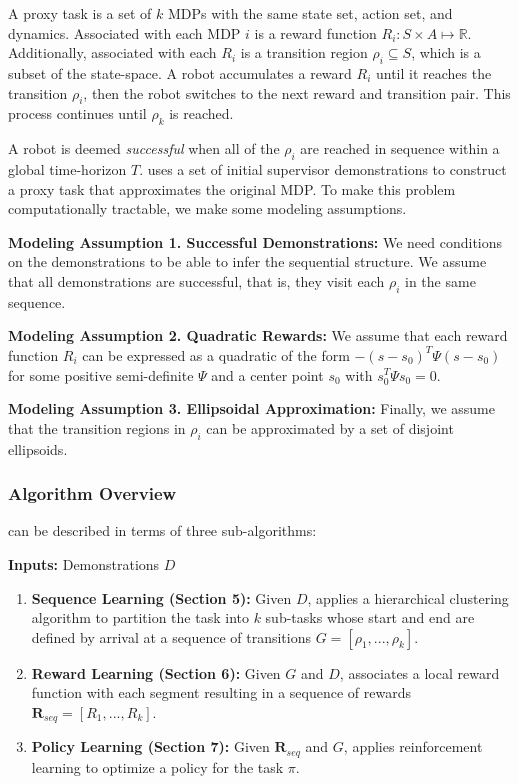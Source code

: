 \begin{definition}
A proxy task is a set of $k$ MDPs with the same state set, action set, and dynamics. 
Associated with each MDP $i$ is a reward function  $R_i: S \times A \mapsto \mathbb{R}$. Additionally, associated with each $R_i$ is a transition region $\rho_i \subseteq S$, which is a subset of the state-space. A robot accumulates a reward $R_i$ until it reaches the transition $\rho_i$, then the robot switches to the next reward and transition pair.
This process continues until $\rho_k$ is reached.
\end{definition}

A robot is deemed \emph{successful} when all of the $\rho_i$ are reached in sequence within a global time-horizon $T$. \hirl uses a set of initial supervisor demonstrations to construct a proxy task that approximates the original MDP. To make this problem computationally tractable, we make some modeling assumptions.

\vspace{0.5em}\noindent\textbf{Modeling Assumption 1. Successful Demonstrations: } We need conditions on the demonstrations to be able to infer the sequential structure. We assume that all demonstrations are successful, that is, they visit each $\rho_i$ in the same sequence.

\vspace{0.5em}\noindent\textbf{Modeling Assumption 2. Quadratic Rewards: } We assume that each reward function $R_i$ can be expressed as a quadratic of the form $-(s-s_0)^T \Psi (s - s_0)$ for some positive semi-definite $\Psi$ and a center point $s_0$ with $s_0^T \Psi s_0 = 0$. 

\vspace{0.5em}\noindent\textbf{Modeling Assumption 3. Ellipsoidal Approximation: } Finally, we assume that the transition regions in $\rho_i$ can be approximated by a set of disjoint ellipsoids.

\subsubsection{Algorithm Overview}
\hirl can be described in terms of three sub-algorithms:

\vspace{4pt}

\noindent\textbf{Inputs:} Demonstrations $D$
\begin{enumerate}
    \item \textbf{Sequence Learning (Section 5): } Given $D$, \hirl applies a hierarchical clustering algorithm to partition the task into $k$ sub-tasks whose start and end are defined by arrival at a sequence of transitions $G = [\rho_1,...,\rho_k]$.
    \item \textbf{Reward Learning (Section 6): } Given $G$ and $D$, \hirl associates a local reward function with each segment resulting in a sequence of rewards $\mathbf{R}_{seq} = [R_1,...,R_k]$. 
    \item \textbf{Policy Learning (Section 7): } Given $\mathbf{R}_{seq}$ and $G$, \hirl applies reinforcement learning to optimize a policy for the task $\pi$. 
\end{enumerate}

